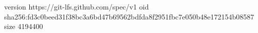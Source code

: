 version https://git-lfs.github.com/spec/v1
oid sha256:fd3c0beed31f38bc3a6bd47b69562bdfda8f2951fbc7e050b48e172154b08587
size 4194400
